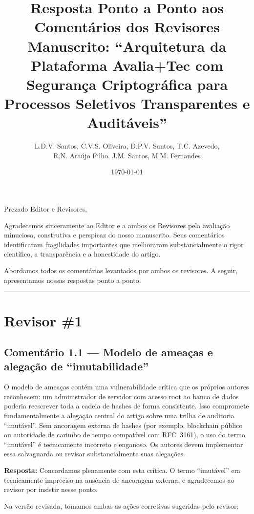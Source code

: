 \documentclass[11pt,a4paper]{article}
\title{Resposta Ponto a Ponto aos Comentários dos Revisores\\[0.3em]
\large Manuscrito: ``Arquitetura da Plataforma Avalia+Tec com Segurança Criptográfica para\\
Processos Seletivos Transparentes e Auditáveis''}
\author{L.D.V. Santos, C.V.S. Oliveira, D.P.V. Santos, T.C. Azevedo,\\
R.N. Araújo Filho, J.M. Santos, M.M. Fernandes}
\date{\today}
\newcommand{\response}[1]{\par\noindent\textcolor{responsecolor}{\textbf{Resposta:}} #1}
\begin{document}
\maketitle

\noindent Prezado Editor e Revisores,

\medskip
\noindent Agradecemos sinceramente ao Editor e a ambos os Revisores pela avaliação minuciosa, construtiva e perspicaz do nosso manuscrito. Seus comentários identificaram fragilidades importantes que melhoraram substancialmente o rigor científico, a transparência e a honestidade do artigo.

Abordamos todos os comentários levantados por ambos os revisores. A seguir, apresentamos nossas respostas ponto a ponto.

\bigskip
\hrule
\bigskip

\section*{Revisor \#1}

\subsection*{Comentário 1.1 --- Modelo de ameaças e alegação de ``imutabilidade''}

\begin{reviewerbox}
O modelo de ameaças contém uma vulnerabilidade crítica que os próprios autores reconhecem: um administrador de servidor com acesso root ao banco de dados poderia reescrever toda a cadeia de hashes de forma consistente. Isso compromete fundamentalmente a alegação central do artigo sobre uma trilha de auditoria ``imutável''. Sem ancoragem externa de hashes (por exemplo, blockchain público ou autoridade de carimbo de tempo compatível com RFC~3161), o uso do termo ``imutável'' é tecnicamente incorreto e enganoso. Os autores devem implementar essa salvaguarda ou revisar substancialmente suas alegações.
\end{reviewerbox}

\response{Concordamos plenamente com esta crítica. O termo ``imutável'' era tecnicamente impreciso na ausência de ancoragem externa, e agradecemos ao revisor por insistir nesse ponto.}

Na versão revisada, tomamos ambas as ações corretivas sugeridas pelo revisor:
\end{document}
